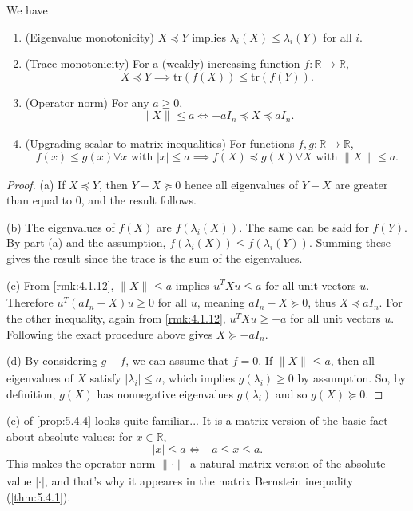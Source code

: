 \begin{proposition}
\label{prop:5.4.4}
We have
\begin{enumerate}
	\item (Eigenvalue monotonicity) $X \preceq Y$ implies $\lambda_i(X) \leq \lambda_i(Y)$ for all $i$.
	\item (Trace monotonicity) For a (weakly) increasing function $f: \mathbb{R} \to \mathbb{R}$, 
	\[ X \preceq Y \implies \mathrm{tr}(f(X)) \leq \mathrm{tr}(f(Y)). \]
	\item (Operator norm) For any $a \geq 0$, 
	\[ \lVert X \rVert_{} \leq a \iff -aI_n \preceq X \preceq aI_n. \]
	\item (Upgrading scalar to matrix inequalities) For functions $f, g: \mathbb{R} \to \mathbb{R}$, 
	\[ f(x) \leq g(x) \forall x \text{ with } |x|\leq a \implies 
	f(X) \preceq g(X) \forall X \text{ with } \lVert X \rVert_{} \leq a. \]
\end{enumerate}
\end{proposition}

\begin{proof}
(a) If $X \preceq Y$, then $Y - X \succeq 0$ hence all eigenvalues of $Y - X$ are greater than equal to 0, 
and the result follows.

(b) The eigenvalues of $f(X)$ are $f(\lambda_i(X))$. The same can be said for $f(Y)$. By part (a) and the 
assumption, $f(\lambda_i(X)) \leq f(\lambda_i(Y))$. Summing these gives the result since the trace is the sum 
of the eigenvalues.

(c) From \cref{rmk:4.1.12}, $\lVert X \rVert_{} \leq a$ implies $u^T Xu \leq a$ for all unit vectors $u$. 
Therefore $u^T(aI_n - X)u \geq 0$ for all $u$, meaning $aI_n - X \succeq 0$, thus $X \preceq aI_n$. For the 
other inequality, again from \cref{rmk:4.1.12}, $u^T Xu \geq -a$ for all unit vectors $u$. Following the 
exact procedure above gives $X \succeq -aI_n$.

(d) By considering $g - f$, we can assume that $f = 0$. If $\lVert X \rVert_{} \leq a$, then all eigenvalues 
of $X$ satisfy $|\lambda_i| \leq a$, which implies $g(\lambda_i) \geq 0$ by assumption. So, by definition, 
$g(X)$ has nonnegative eigenvalues $g(\lambda_i)$ and so $g(X) \succeq 0$.
\end{proof}

\begin{remark}
\label{rmk:5.4.5}
(c) of \cref{prop:5.4.4} looks quite familiar... It is a matrix version of the basic fact about absolute 
values: for $x \in \mathbb{R}$, 
\[ |x| \leq a \iff -a \leq x \leq a. \]
This makes the operator norm $\lVert \cdot \rVert_{}$ a natural matrix version of the absolute value $|\cdot|$, 
and that's why it appeares in the matrix Bernstein inequality (\cref{thm:5.4.1}).
\end{remark}

